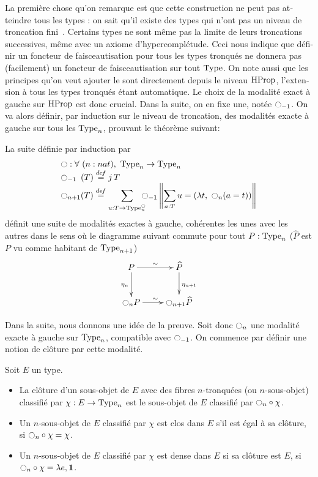\begin{otherlanguage}{french}
La première chose qu'on remarque est que cette construction ne peut
pas atteindre tous les types : on sait qu'il existe des types qui
n'ont pas un niveau de troncation fini~\cite[Example
8.8.6]{hottbook}. Certains types ne sont même pas la limite de leurs
troncations successives, même avec un axiome d'hypercomplétude. Ceci
nous indique que définir un foncteur de faisceautisation pour tous les
types tronqués ne donnera pas (facilement) un foncteur de
faisceautisation sur tout $\operatorname{Type}$.
On note aussi que les principes qu'on veut ajouter le sont directement
depuis le niveau $\operatorname{HProp}$, l'extension à tous les types tronqués étant
automatique. Le choix de la modalité exact à gauche sur $\operatorname{HProp}$ est
donc crucial. Dans la suite, on en fixe une, notée $\ocircle_{-1}$.
On va alors définir, par induction sur le niveau de troncation, des
modalités exacte à gauche sur tous les $\operatorname{Type}_n$, prouvant le théorème
suivant:

\begin{thmfr}
  La suite définie par induction par
  \[ \begin{array}{l}
    \ocircle : \forall \ (n : nat), \ \operatorname{Type}_n \to \operatorname{Type}_n 
    \\
    \ocircle_{-1\phantom{n}}(T) \overset{de\hspace{-0.2ex}f}{=} \mathop{j} T \\
    
    \displaystyle{\ensuremath{\ocircle}_{n+1}(T)} \overset{de\hspace{-0.2ex}f}{=}  
    \displaystyle{\sum_{u:T \to \operatorname{Type}_n^{\ensuremath{\ocircle}}} \!\!\!\!\ensuremath{\ocircle}_{-1} 
      \left\|
        \sum_{a:T} u= (\lambda t,~\ensuremath{\ocircle}_n (a=t))
      \right\|}
  \end{array}
  \]
  définit une suite de modalités exactes à gauche, cohérentes les unes
  avec les autres dans le sens où le diagramme suivant commute pour
  tout $P:\operatorname{Type}_n$ ($\hat P$ est $P$ vu comme habitant de $\operatorname{Type}_{n+1}$)
\[ \xymatrix{
    P \ar@{->}^{\sim}[r] \ar[d]_{\eta_{n}} & \widehat P \ar[d]^{\eta_{n+1}} \\
    \modal_{n} P \ar@{->}^{\sim}[r] & \modal_{n+1} \widehat P 
  } \]
\end{thmfr}

Dans la suite, nous donnons une idée de la preuve. Soit donc
$\ocircle_n$ une modalité exacte à gauche sur $\operatorname{Type}_n$, compatible avec
$\ocircle_{-1}$. On commence par définir une notion de clôture par cette
modalité.

\begin{defifr}
  Soit $E$ un type.
  \begin{itemize}
  \item La clôture d'un sous-objet de $E$ avec des fibres
    $n$-tronquées (ou $n$-sous-objet) classifié par $\chi:
    E\to\operatorname{Type}_n$ est le sous-objet de $E$ classifié par $\ocircle_n
    \circ \chi$.
  \item Un $n$-sous-objet de $E$ classifié par $\chi$ est clos dans
    $E$ s'il est égal à sa clôture, \ie{} si $\ocircle_n \circ \chi =
    \chi$.
  \item Un $n$-sous-objet de $E$ classifié par $\chi$ est dense dans
    $E$ si sa clôture est $E$, \ie{} si $\ocircle_n \circ \chi =
    \lambda e,\mathbf{1}$.
  \end{itemize}
\end{defifr}


\end{otherlanguage}

